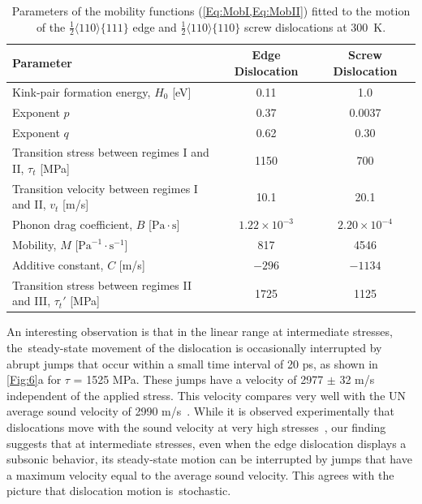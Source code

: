 \documentclass[applsci,article,accept,pdftex,moreauthors]{Definitions/mdpi}
\newcommand{\?}{\stackrel{?}{=}}
\begin{document}
\begin{table}[H]
\tablesize{\small}
\caption{Parameters of the mobility functions (\cref{Eq:MobI,Eq:MobII}) fitted to the motion of the $\frac{1}{2}\langle110\rangle\{111\}$ edge and $\frac{1}{2}\langle110\rangle\{110\}$ screw dislocations at 300~K.}
\begin{tabularx}{\textwidth}{lcc}
\toprule
\textbf{Parameter} & \textbf{Edge Dislocation} & \textbf{Screw Dislocation} \\
\midrule
Kink-pair formation energy, $H_0$ [eV] & 0.11 & 1.0 \\
Exponent $p$ & 0.37 & 0.0037 \\
Exponent $q$ & 0.62 & 0.30 \\
Transition stress between regimes I and II, $\tau_t$ [MPa] & 1150 & 700 \\
Transition velocity between regimes I and II, $v_t$ [m/s] & 10.1 & 20.1 \\
Phonon drag coefficient, $B$ [$\mathrm{Pa} \! \cdot \! \mathrm{s}$] & $1.22 \times 10^{-3}$ & $2.20 \times 10^{-4}$ \\ 
Mobility, $M$ [$\mathrm{Pa}^{-1} \! \cdot \! \mathrm{s}^{-1}$] & 817 & 4546 \\
Additive constant, $C$ [m/s] & $-296$ & $-1134$ \\
Transition stress between regimes II and III, $\tau_t'$ [MPa] & 1725 & 1125 \\
\bottomrule
\end{tabularx}
\label{Tab:DislocParams}
\end{table}

An interesting observation is that in the linear range at intermediate stresses, the~steady-state movement of the dislocation is occasionally interrupted by abrupt jumps that occur within a small time interval of 20 ps, as shown in \cref{Fig:6}a for $\tau$ = 1525 MPa. These jumps have a velocity of 2977 $\pm$ 32 m/s independent of the applied stress. This velocity compares very well with the UN average sound velocity of 2990 m/s~\cite{Baranov2013}. While it is observed experimentally that dislocations move with the sound velocity at very high stresses~\cite{Johnston1959}, our finding suggests that at intermediate stresses, even when the edge dislocation displays a subsonic behavior, its steady-state motion can be interrupted by jumps that have a maximum velocity equal to the average sound velocity. This agrees with the picture that dislocation motion is~stochastic.
\end{document}
